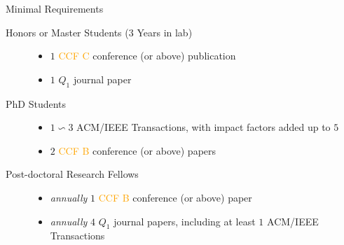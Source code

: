 \documentclass[
 size=14pt,
 paper=smartboard,  %
 mode=present, 		%
 display=slides, 	%
 style=tuliplab,  	%
 pauseslide,
 fleqn,leqno]{powerdot}{}
\begin{document}
%
%


\begin{slide}{Minimal Requirements}
\begin{description}
\item[Honors or Master Students ($3$ Years in lab)]
    \begin{itemize}
        \item $1$ \textcolor{orange}{CCF C} conference (or above) publication
        \item $1$ $Q_1$ journal paper
    \end{itemize}
    
\item[PhD Students]
    \begin{itemize}
        \item $1 \backsim 3$ ACM/IEEE Transactions, with impact factors added up to $5$
        \item $2$ \textcolor{orange}{CCF B} conference (or above) papers
    \end{itemize}

\item[Post-doctoral Research Fellows]
    \begin{itemize}
    \item \textit{annually} $1$ \textcolor{orange}{CCF B} conference (or above) paper
    \item \textit{annually} $4$ $Q_1$ journal papers, including at least $1$ ACM/IEEE Transactions
    \end{itemize}
    
\end{description}
\end{slide}
\end{document}
